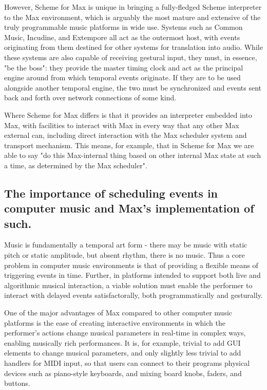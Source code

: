 \documentclass[acmsmall]{acmart}
\begin{document}
However, Scheme for Max is unique in bringing a fully-fledged Scheme interpreter
to the Max environment, which is arguably the most mature and extensive of 
the truly programmable music platforms in wide use.
Systems such as Common Music, Incudine, and Extempore
all act as the outermost host, with events originating from them destined
for other systems for translation into audio. While these systems are also capable
of receiving gestural input, they must, in essence, "be the boss": they provide
the master timing clock and act as the principal engine around from which temporal
events originate. If they are to be used alongside another temporal engine, the two
must be synchronized and events sent back and forth over network connections of some kind.

Where Scheme for Max differs is that it provides an interpreter embedded into Max,
with facilities to interact with Max in every way that any other Max external can,
including direct interaction with the Max scheduler system and transport
mechanism. This means, for example, that in Scheme for Max we are able to say
"do this Max-internal thing based on other internal Max state at such a time,
as determined by the Max scheduler".  


\subsection{The importance of scheduling events in computer music and Max's implementation of such.}

Music is fundamentally a temporal art form - there may be music with static pitch
or static amplitude, but absent rhythm, there is no music.  %
Thus a core problem in computer music environments  is that of providing a flexible 
means of triggering events in time. Further, in platforms intended to support both
live and algorithmic musical interaction, a viable solution must enable the performer to interact
with delayed events satisfactorally, both programmatically and gesturally. 

One of the major advantages of Max compared to other computer music platforms 
is the ease of creating interactive environments in which the performer's actions 
change musical parameters in real-time in complex ways, enabling 
musically rich performances. It is, for example, trivial to add GUI elements to change
musical parameters, and only slightly less trivial to add handlers for MIDI input, 
so that users can connect to their programs physical devices such as
piano-style keyboards, and mixing board knobs, faders, and buttons. 
\end{document}
